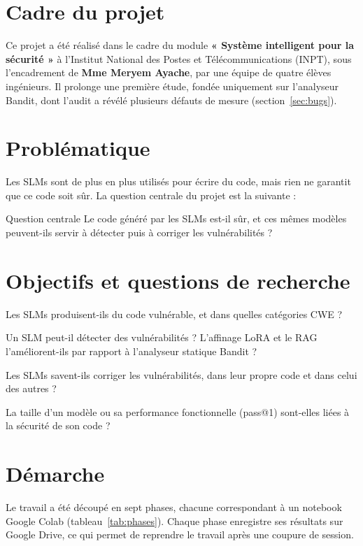 \documentclass[11pt,a4paper,oneside]{report}
\begin{document}
\section{Cadre du projet}
Ce projet a été réalisé dans le cadre du module \textbf{« Système intelligent pour la sécurité »} à l'Institut National des Postes et Télécommunications (INPT), sous l'encadrement de \textbf{Mme Meryem Ayache}, par une équipe de quatre élèves ingénieurs. Il prolonge une première étude, fondée uniquement sur l'analyseur Bandit, dont l'audit a révélé plusieurs défauts de mesure (section~\ref{sec:bugs}).

\section{Problématique}
Les SLMs sont de plus en plus utilisés pour écrire du code, mais rien ne garantit que ce code soit sûr. La question centrale du projet est la suivante :

\begin{encadre}{Question centrale}
Le code généré par les SLMs est-il sûr, et ces mêmes modèles peuvent-ils servir à détecter puis à corriger les vulnérabilités ?
\end{encadre}

\section{Objectifs et questions de recherche}
\begin{description}[leftmargin=1.2cm,style=nextline]
  \item[Q1 — Génération] Les SLMs produisent-ils du code vulnérable, et dans quelles catégories CWE ?
  \item[Q2 — Détection] Un SLM peut-il détecter des vulnérabilités ? L'affinage LoRA et le RAG l'améliorent-ils par rapport à l'analyseur statique Bandit ?
  \item[Q3 — Correction] Les SLMs savent-ils corriger les vulnérabilités, dans leur propre code et dans celui des autres ?
  \item[Q4 — Taille et qualité] La taille d'un modèle ou sa performance fonctionnelle (pass@1) sont-elles liées à la sécurité de son code ?
\end{description}

\section{Démarche}
Le travail a été découpé en sept phases, chacune correspondant à un notebook Google Colab (tableau~\ref{tab:phases}). Chaque phase enregistre ses résultats sur Google Drive, ce qui permet de reprendre le travail après une coupure de session.
\end{document}
